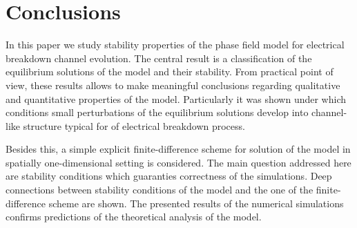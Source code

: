 
\section{Conclusions}

In this paper we study stability properties of the phase field model
for electrical breakdown channel evolution.
The central result is a classification of the
equilibrium solutions of the model and their stability.
From practical point of view, these results allows to
make meaningful conclusions regarding qualitative and quantitative
properties of the model. Particularly it was shown under which
conditions small perturbations of the equilibrium solutions
develop into channel-like structure typical for of electrical breakdown
process.

Besides this, a simple explicit finite-difference scheme
for solution of the model in spatially one-dimensional setting is considered.
The main question addressed here are stability conditions which guaranties
correctness of the simulations. Deep connections between
stability conditions of the model and the one of the
finite-difference scheme are shown.
The presented results of the numerical simulations confirms
predictions of the theoretical analysis of the model.

\endinput